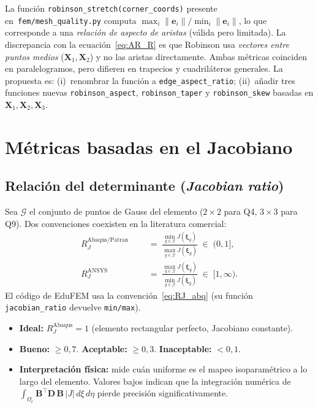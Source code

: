 \documentclass[11pt,a4paper]{article}
\begin{document}
\begin{notabox}[title={Sobre la implementaci\'on actual en EduFEM}]
La funci\'on \texttt{robinson\_stretch(corner\_coords)} presente en~\texttt{fem/mesh\_quality.py} computa $\max_i\|\mathbf{e}_i\|/\min_i\|\mathbf{e}_i\|$, lo que corresponde a una \emph{relaci\'on de aspecto de aristas} (v\'alida pero limitada). La discrepancia con la ecuaci\'on~\eqref{eq:AR_R} es que Robinson usa \emph{vectores entre puntos medios} ($\mathbf{X}_1,\mathbf{X}_2$) y no las aristas directamente. Ambas m\'etricas coinciden en paralelogramos, pero difieren en trapecios y cuadril\'ateros generales. La propuesta es: (i)~renombrar la funci\'on a \texttt{edge\_aspect\_ratio}; (ii)~a\~nadir tres funciones nuevas \texttt{robinson\_aspect}, \texttt{robinson\_taper} y \texttt{robinson\_skew} basadas en $\mathbf{X}_1,\mathbf{X}_2,\mathbf{X}_3$.
\end{notabox}

\section{M\'etricas basadas en el Jacobiano}
\label{sec:jac}

\subsection{Relaci\'on del determinante (\emph{Jacobian ratio})}

Sea $\mathcal{G}$ el conjunto de puntos de Gauss del elemento ($2\!\times\!2$ para Q4, $3\!\times\!3$ para Q9). Dos convenciones coexisten en la literatura comercial:
\begin{align}
R_J^{\text{Abaqus/Patran}} &\;=\; \frac{\min_{g\in\mathcal{G}} J(\boldsymbol{\xi}_g)}{\max_{g\in\mathcal{G}} J(\boldsymbol{\xi}_g)} \;\in\;(0,1], \label{eq:RJ_abq}\\[2pt]
R_J^{\text{ANSYS}}\phantom{/Patran} &\;=\; \frac{\max_{g\in\mathcal{G}} J(\boldsymbol{\xi}_g)}{\min_{g\in\mathcal{G}} J(\boldsymbol{\xi}_g)} \;\in\;[1,\infty). \label{eq:RJ_ans}
\end{align}
El c\'odigo de EduFEM usa la convenci\'on~\eqref{eq:RJ_abq} (su funci\'on \texttt{jacobian\_ratio} devuelve \texttt{min/max}).
\begin{itemize}[leftmargin=1.2em]
  \item \textbf{Ideal:} $R_J^{\text{Abaqus}}=1$ (elemento rectangular perfecto, Jacobiano constante).
  \item \textbf{Bueno:} $\ge 0{,}7$. \textbf{Aceptable:} $\ge 0{,}3$. \textbf{Inaceptable:} $<0{,}1$.
  \item \textbf{Interpretaci\'on f\'isica:} mide cu\'an uniforme es el mapeo isoparam\'etrico a lo largo del elemento. Valores bajos indican que la integraci\'on num\'erica de $\int_{\Omega_e} \mathbf{B}^{\!\top}\mathbf{D}\,\mathbf{B}\,|J|\,d\xi\,d\eta$ pierde precisi\'on significativamente.
\end{itemize}
\end{document}
